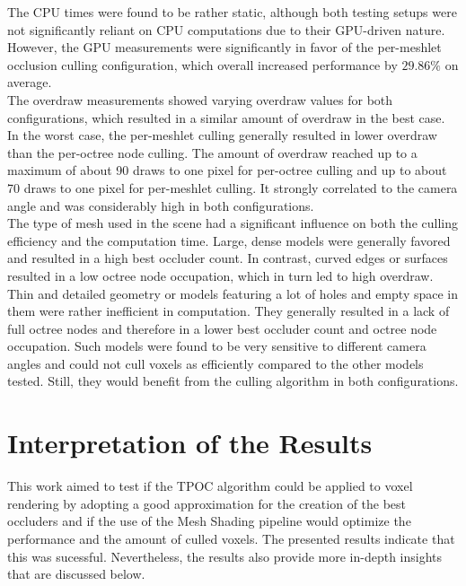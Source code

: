 \noindent
The \ac{CPU} times were found to be rather static, although both testing setups were not significantly reliant 
on \ac{CPU} computations due to their \ac{GPU}-driven nature. However, the \ac{GPU} measurements were significantly 
in favor of the per-meshlet occlusion culling configuration, which overall increased performance by $29.86\%$ on 
average. \\

\noindent
The overdraw measurements showed varying overdraw values for both configurations, which resulted in a similar amount 
of overdraw in the best case. In the worst case, the per-meshlet culling generally resulted in lower overdraw than 
the per-octree node culling. The amount of overdraw reached up to a maximum of about 90 draws to one pixel for 
per-octree culling and up to about 70 draws to one pixel for per-meshlet culling. It strongly correlated to the 
camera angle and was considerably high in both configurations. \\ 

\noindent
The type of mesh used in the scene had a significant influence on both the culling efficiency and the computation time.
Large, dense models were generally favored and resulted in a high best occluder count. In contrast, curved edges or 
surfaces resulted in a low octree node occupation, which in turn led to high overdraw. Thin and detailed geometry or 
models featuring a lot of holes and empty space in them were rather inefficient in computation. They generally resulted 
in a lack of full octree nodes and therefore in a lower best occluder count and octree node occupation. Such models 
were found to be very sensitive to different camera angles and could not cull voxels as efficiently compared to the 
other models tested. Still, they would benefit from the culling algorithm in both configurations.

\section{Interpretation of the Results}

This work aimed to test if the \ac{TPOC} algorithm could be applied to voxel rendering by adopting a good approximation 
for the creation of the best occluders and if the use of the Mesh Shading pipeline would optimize the performance and 
the amount of culled voxels. The presented results indicate that this was sucessful. Nevertheless, the results also 
provide more in-depth insights that are discussed below. \\


